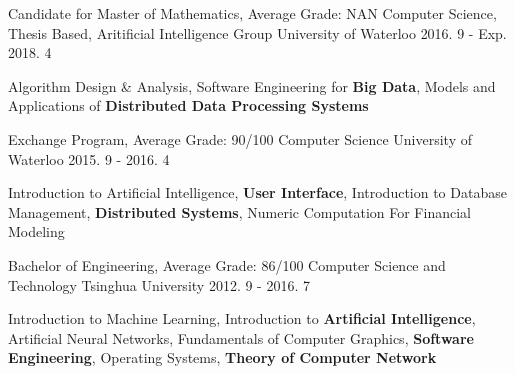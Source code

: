 \begin{cventries}
 
  \cventry
    {Candidate for Master of Mathematics, Average Grade: NAN}
    {Computer Science, Thesis Based, Aritificial Intelligence Group}
    {University of Waterloo}
    {2016. 9 - Exp. 2018. 4}
    {
      \begin{cvitems}
          \item{Algorithm Design \& Analysis, Software Engineering for {\bf Big Data}, Models and Applications of {\bf Distributed Data Processing Systems}}
      \end{cvitems}
    }

  \cventry
    {Exchange Program, Average Grade: 90/100}
    {Computer Science}
    {University of Waterloo}
    {2015. 9 - 2016. 4}
    {
      \begin{cvitems}
          \item {Introduction to Artificial Intelligence, {\bf User Interface}, Introduction to Database Management, {\bf Distributed Systems}, Numeric Computation For Financial Modeling}
      \end{cvitems}
    }
  \cventry
    {Bachelor of Engineering, Average Grade: 86/100}
    {Computer Science and Technology}
    {Tsinghua University}
    {2012. 9 - 2016. 7}
    {
      \begin{cvitems}
          \item {Introduction to Machine Learning, Introduction to {\bf Artificial Intelligence}, Artificial Neural Networks, Fundamentals of Computer Graphics, {\bf Software Engineering},  Operating Systems, {\bf Theory of Computer Network}}
      \end{cvitems}
    }

\end{cventries}
